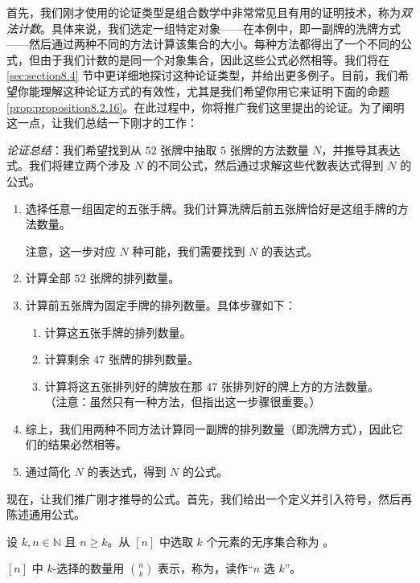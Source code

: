 首先，我们刚才使用的论证类型是组合数学中非常常见且有用的证明技术，称为\emph{双法计数}。具体来说，我们选定一组特定对象——在本例中，即一副牌的洗牌方式——然后通过两种不同的方法计算该集合的大小。每种方法都得出了一个不同的公式，但由于我们计数的是同一个对象集合，因此这些公式必然相等。我们将在 \ref{sec:section8.4} 节中更详细地探讨这种论证类型，并给出更多例子。目前，我们希望你能理解这种论证方式的有效性，尤其是我们希望你用它来证明下面的命题 \ref{prop:proposition8.2.16}。在此过程中，你将推广我们这里提出的论证。为了阐明这一点，让我们总结一下刚才的工作：

\emph{论证总结}：我们希望找到从 $52$ 张牌中抽取 $5$ 张牌的方法数量 $N$，并推导其表达式。我们将建立两个涉及 $N$ 的不同公式，然后通过求解这些代数表达式得到 $N$ 的公式。

\begin{enumerate}[label=(\arabic*)]
    \item 选择任意一组固定的五张手牌。我们计算洗牌后前五张牌恰好是这组手牌的方法数量。

          注意，这一步对应 $N$ 种可能，我们需要找到 $N$ 的表达式。
    \item 计算全部 $52$ 张牌的排列数量。
    \item 计算前五张牌为固定手牌的排列数量。具体步骤如下：
          \begin{enumerate}[label=(\roman*)]
              \item 计算这五张手牌的排列数量。
              \item 计算剩余 $47$ 张牌的排列数量。
              \item 计算将这五张排列好的牌放在那 $47$ 张排列好的牌上方的方法数量。\\（注意：虽然只有一种方法，但指出这一步骤很重要。）
          \end{enumerate}
    \item 综上，我们用两种不同方法计算同一副牌的排列数量（即洗牌方式），因此它们的结果必然相等。
    \item 通过简化 $N$ 的表达式，得到 $N$ 的公式。
\end{enumerate}
现在，让我们推广刚才推导的公式。首先，我们给出一个定义并引入符号，然后再陈述通用公式。

\begin{definition}
    设 $k, n \in \mathbb{N}$ 且 $n \ge k$。从 $[n]$ 中选取 $k$ 个元素的无序集合称为 。

    $[n]$ 中 $k$-选择的数量用 ${n \choose k}$ 表示，称为，读作``$n$ 选 $k$''。
\end{definition}


